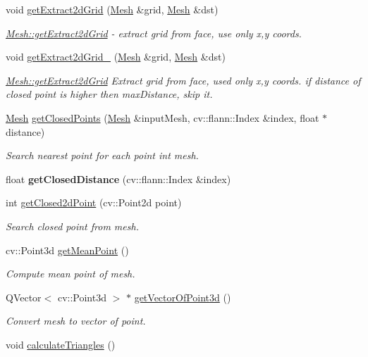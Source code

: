 \begin{DoxyCompactItemize}
void \hyperlink{class_mesh_ad9fb7ec4fe3cd1f5a511654739029c33}{get\+Extract2d\+Grid} (\hyperlink{class_mesh}{Mesh} \&grid, \hyperlink{class_mesh}{Mesh} \&dst)
\begin{DoxyCompactList}\small\item\em \hyperlink{class_mesh_a2b8b2a62e220de4cc9e3e19c0a0a6071}{Mesh\+::get\+Extract2d\+Grid} -\/ extract grid from face, use only x,y coords. \end{DoxyCompactList}\item 
void \hyperlink{class_mesh_aa39be434d3573cd6b3e9de6d2f36502a}{get\+Extract2d\+Grid\+\_} (\hyperlink{class_mesh}{Mesh} \&grid, \hyperlink{class_mesh}{Mesh} \&dst)
\begin{DoxyCompactList}\small\item\em \hyperlink{class_mesh_a2b8b2a62e220de4cc9e3e19c0a0a6071}{Mesh\+::get\+Extract2d\+Grid} Extract grid from face, used only x,y coords. if distance of closed point is higher then max\+Distance, skip it. \end{DoxyCompactList}\item 
\hyperlink{class_mesh}{Mesh} \hyperlink{class_mesh_a0752d96a941240e508b605281a3bb5f0}{get\+Closed\+Points} (\hyperlink{class_mesh}{Mesh} \&input\+Mesh, cv\+::flann\+::\+Index \&index, float $\ast$distance)
\begin{DoxyCompactList}\small\item\em Search nearest point for each point int mesh. \end{DoxyCompactList}\item 
\hypertarget{class_mesh_adb5c20ded833a9c01773acb2de4304d9}{float {\bfseries get\+Closed\+Distance} (cv\+::flann\+::\+Index \&index)}\label{class_mesh_adb5c20ded833a9c01773acb2de4304d9}

\item 
int \hyperlink{class_mesh_a2e91d8acdb1737e0eaf94576d8406a6e}{get\+Closed2d\+Point} (cv\+::\+Point2d point)
\begin{DoxyCompactList}\small\item\em Search closed point from mesh. \end{DoxyCompactList}\item 
cv\+::\+Point3d \hyperlink{class_mesh_a3a9fb77fbb9b1ff5b7a33ee5ab783b93}{get\+Mean\+Point} ()
\begin{DoxyCompactList}\small\item\em Compute mean point of mesh. \end{DoxyCompactList}\item 
Q\+Vector$<$ cv\+::\+Point3d $>$ $\ast$ \hyperlink{class_mesh_ae18bb93929f87c35f50122e7725e097e}{get\+Vector\+Of\+Point3d} ()
\begin{DoxyCompactList}\small\item\em Convert mesh to vector of point. \end{DoxyCompactList}\item 
\hypertarget{class_mesh_ad69edfbb7cde40edb166831358e0e5ac}{void \hyperlink{class_mesh_ad69edfbb7cde40edb166831358e0e5ac}{calculate\+Triangles} ()}\label{class_mesh_ad69edfbb7cde40edb166831358e0e5ac}


\end{DoxyCompactItemize}
